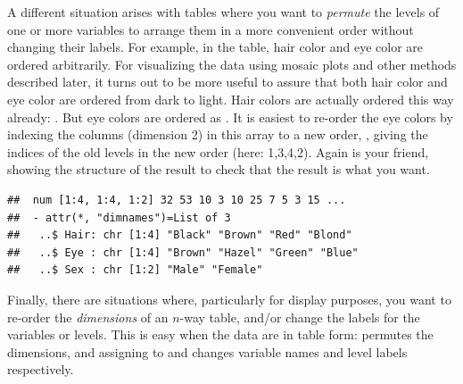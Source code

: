 \documentclass[11pt]{book}
\renewenvironment{knitrout}{\small\renewcommand{\baselinestretch}{.85}}{} %
\begin{document}
A different situation arises with tables where you want to \emph{permute} the levels
of one or more variables to arrange them in a more convenient order without changing
their labels. For example, in the  table, hair color and eye color are ordered arbitrarily.
For visualizing the data using mosaic plots and other methods described later, it 
turns out to be more useful to assure that both hair color and eye color are
ordered from dark to light.
Hair colors are actually ordered this way already:
.
But eye colors are ordered as .
It is easiest to re-order the
eye colors by indexing the columns (dimension 2) in this array to a new order,
, giving the
indices of the old levels in the new order (here: 1,3,4,2).
Again  is your friend, showing the structure of the result
to check that the result is what you want.

\begin{knitrout}
\color{fgcolor}\begin{kframe}
\begin{alltt}
 \hlstd{=}\hlstd{)}
 \hlkwb{<-} \hlstd{HairEyeColor[,} \hlstd{(}\hlstd{,}\hlstd{,}\hlstd{,}\hlstd{), ]}
\end{alltt}
\begin{verbatim}
##  num [1:4, 1:4, 1:2] 32 53 10 3 10 25 7 5 3 15 ...
##  - attr(*, "dimnames")=List of 3
##   ..$ Hair: chr [1:4] "Black" "Brown" "Red" "Blond"
##   ..$ Eye : chr [1:4] "Brown" "Hazel" "Green" "Blue"
##   ..$ Sex : chr [1:2] "Male" "Female"
\end{verbatim}
\end{kframe}
\end{knitrout}

Finally, there are situations where, particularly for display purposes, you
want to re-order the \emph{dimensions} of an $n$-way table, and/or change the
labels for the variables or levels.
This is easy when the data are in table form:  permutes
the dimensions, and assigning to  and 
changes variable names and level labels respectively.
\end{document}
